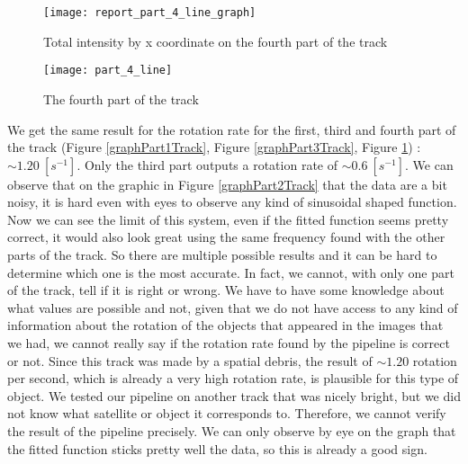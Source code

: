 \documentclass[a4paper,12pt,oneside]{report}
\begin{document}
\begin{figure}[h]
    \begin{minipage}[c]{.47\linewidth}
        \centering
        \texttt{[image: report\_part\_4\_line\_graph]}
        \caption{Total intensity by x coordinate on the fourth part of the track}
        \label{graphPart4Track}
    \end{minipage}
    \hfill
    \begin{minipage}[c]{.47\linewidth}
        \centering
        \texttt{[image: part\_4\_line]}
        \caption{The fourth part of the track}
    \end{minipage}
\end{figure}
\newline
\newline
\newline
\newline
\newline
\newline
\newline
We get the same result for the rotation rate for the first, third and fourth part of the track (Figure \ref{graphPart1Track}, 
Figure \ref{graphPart3Track}, Figure \ref{graphPart4Track}) : $\sim 1.20\ [s^{-1}]$. Only the third part outputs a rotation rate 
of $\sim 0.6\ [s^{-1}]$. We can observe that on the graphic in Figure \ref{graphPart2Track} that the data are a bit noisy, it is hard
even with eyes to observe any kind of sinusoidal shaped function. Now we can see the limit of this system, even if the fitted function 
seems pretty correct, it would also look great using the same frequency found with the other parts of the track. So there are multiple
possible results and it can be hard to determine which one is the most accurate. In fact, we cannot, with only one part of the track,
tell if it is right or wrong. We have to have some knowledge about what values are possible and not, given that we do not have access 
to any kind of information about the rotation of the objects that appeared in the images that we had, we cannot really say if the rotation
rate found by the pipeline is correct or not. 
\newline
\newline
Since this track was made by a spatial debris, the result of $\sim 1.20$ rotation per second, which is already a very high rotation rate, 
is plausible for this type of object. 
\newline
\newline
We tested our pipeline on another track that was nicely bright, but we did not know what satellite or object it corresponds to. Therefore,
we cannot verify the result of the pipeline precisely. We can only observe by eye on the graph that the fitted function sticks pretty
well the data, so this is already a good sign.
\end{document}
